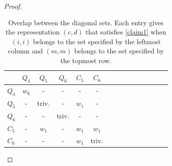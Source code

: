 \documentclass[a4paper,11pt]{article}
\theoremstyle{plain}
\theoremstyle{definition}
\begin{document}
\begin{proof}
\begin{table}[H]
\begin{center}
\begin{tabular}{ |a|c|c|c|c|c|c|c|c|c|c|c|c|c|c| } 
 \hline
& $Q_4$ & $Q_5$  & $Q_6$ & $C_5$ & $C_6$\\
\hline
$Q_4$ & $w_6$ & -  & - & - & -   \\
\hline
$Q_5$ & - & triv. &  - & $w_1$ & - \\ 
\hline
$Q_6$ &- & - &  triv. & - & -  \\ 
\hline
$C_5$ & - & $w_1$  & - & $w_1$ & $w_1$ \\
\hline 
$C_6$ & - & - &  - & $w_1$ & triv. \\
\hline
\end{tabular}
\end{center}
\caption{Overlap between the diagonal sets.  Each entry gives the representation $(c,d)$ that satisfies \eqref{claim1} when $(i,i)$ belongs to the set specified by the leftmost column and $(m,m)$ belongs to the set specified by the topmost row.}
\label{table2}
\end{table}


\end{proof}
\end{document}
